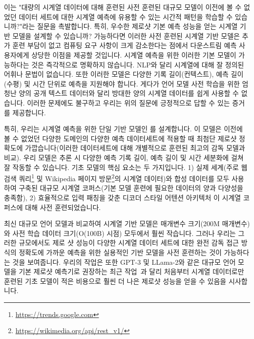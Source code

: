 \documentclass{article}
\begin{document}
이는 "대량의 시계열 데이터에 대해 훈련된 사전 훈련된 대규모 모델이 이전에 볼 수 없었던 데이터 세트에 대한 시계열 예측에 유용할 수 있는 시간적 패턴을 학습할 수 있습니까?"라는 질문을 촉발합니다. 특히, 우수한 제로샷 기본 예측 성능을 얻는 시계열 기반 모델을 설계할 수 있습니까? 가능하다면 이러한 사전 훈련된 시계열 기반 모델은 추가 훈련 부담이 없고 컴퓨팅 요구 사항이 크게 감소한다는 점에서 다운스트림 예측 사용자에게 상당한 이점을 제공할 것입니다. 시계열 예측을 위한 이러한 기본 모델이 가능하다는 것은 즉각적으로 명확하지 않습니다. NLP와 달리 시계열에 대해 잘 정의된 어휘나 문법이 없습니다. 또한 이러한 모델은 다양한 기록 길이(컨텍스트), 예측 길이(수평) 및 시간 단위로 예측을 지원해야 합니다. 게다가 언어 모델 사전 학습을 위한 엄청난 양의 공개 텍스트 데이터와 달리 방대한 양의 시계열 데이터를 쉽게 사용할 수 없습니다. 이러한 문제에도 불구하고 우리는 위의 질문에 긍정적으로 답할 수 있는 증거를 제공합니다.

특히, 우리는 시계열 예측을 위한 단일 기반 모델인 \emph{\ours}를 설계합니다. 이 모델은 이전에 볼 수 없었던 다양한 도메인의 다양한 예측 데이터세트에 적용할 때 최첨단 제로샷 정확도에 가깝습니다(이러한 데이터세트에 대해 개별적으로 훈련된 최고의 감독 모델과 ​​비교). 우리 모델은 추론 시 다양한 예측 기록 길이, 예측 길이 및 시간 세분화에 걸쳐 잘 작동할 수 있습니다. 기초 모델의 핵심 요소는 두 가지입니다. 1) 실제 세계(주로 웹 검색 쿼리\footnote{\url{https://trends.google.com}} 및 Wikipedia 페이지 방문\footnote{\url{https://wikimedia.org/api/rest_v1/}}의 시계열 데이터)와 합성 데이터를 모두 사용하여 구축된 대규모 시계열 코퍼스(기본 모델 훈련에 필요한 데이터의 양과 다양성을 충족함), 2) 효율적으로 입력 패칭을 갖춘 디코더 스타일 어텐션 아키텍처 이 시계열 코퍼스에 대해 사전 훈련되었습니다.


최신 대규모 언어 모델과 비교하여 시계열 기반 모델은 매개변수 크기(200M 매개변수)와 사전 학습 데이터 크기(O(100B) 시점) 모두에서 훨씬 작습니다. 그러나 우리는 그러한 규모에서도 제로 샷 성능이 다양한 시계열 데이터 세트에 대한 완전 감독 접근 방식의 정확도에 가까운 예측을 위한 실용적인 기반 모델을 사전 훈련하는 것이 가능하다는 것을 보여줍니다. 우리의 작업은 또한 GPT-3 및 LLama-2와 같은 대규모 언어 모델을 기본 제로샷 예측기로 권장하는 최근 작업~\citep{gruver2023large}과 달리 처음부터 시계열 데이터로만 훈련된 기초 모델이 적은 비용으로 훨씬 더 나은 제로샷 성능을 얻을 수 있음을 시사합니다.
\end{document}
